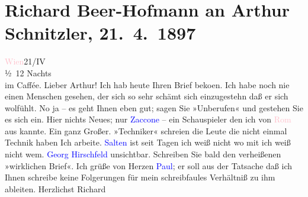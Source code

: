 

               \section[Richard Beer-Hofmann an Arthur Schnitzler, 21. 4. 1897]{ Richard Beer-Hofmann an Arthur Schnitzler,
               21. 4. 1897}\nopagebreak{}\rehead{ }\normalsize\beginnumbering{} \toendnotes[C]{\smallbreak\pagebreak[2]} 
\pstart
           \raggedleft{}{\pb}\textcolor{pink}{Wien}{}\ledrightnote{\textcolor{pink}{Wien}}{ }21/IV{\\}½ 12 Nachts{\\}im Caffée.\pend
           \pstart{}Lieber Arthur!\pend\pstart
           Ich hab heute Ihren Brief beko{\geminationm}en. Ich habe noch nie
               einen Menschen gesehen, der sich so sehr schämt sich einzugestehn {\pb}daß er sich wolfühlt. No ja – es
               geht Ihnen eben gut; sagen Sie »Unberufen« und gestehen Sie es sich ein.\pend
           \pstart
           Hier nichts Neues; nur \textcolor{blue}{Zaccone}{}\ledrightnote{\textcolor{blue}{Ermete Zacconi}} – ein Schauspieler
               den ich von \textcolor{pink}{Rom}{}\ledrightnote{\textcolor{pink}{Rom}} aus kannte. {\pb}Ein ganz Großer. »Techniker«
               schreien die Leute die nicht einmal Technik haben\pend
           \pstart
           Ich arbeite. \textcolor{blue}{Salten}{}\ledrightnote{\textcolor{blue}{Felix Salten}} ist seit Tagen ich weiß nicht
               wo mit ich weiß nicht wem. \textcolor{blue}{Georg Hirschfeld}{}\ledrightnote{\textcolor{blue}{Georg Hirschfeld}}
               unsichtbar. Schreiben {\pb}Sie bald den
               verheißenen »wirklichen Brief«. Ich grüße von Herzen \textcolor{blue}{Paul}{}\ledrightnote{\textcolor{blue}{Paul Goldmann}}; er soll aus der Tatsache daß ich Ihnen schreibe keine Folgerungen für
               mein schreibfaules Verhältniß zu ihm ableiten. Herzlichst\pend
           \pstart \spacefill\mbox{Richard}\pend{}\endnumbering{}  
      